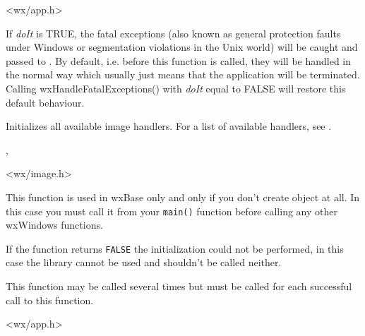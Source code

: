 
<wx/app.h>

\label{wxhandlefatalexceptions}


If {\it doIt} is TRUE, the fatal exceptions (also known as general protection
faults under Windows or segmentation violations in the Unix world) will be
caught and passed to .
By default, i.e. before this function is called, they will be handled in the
normal way which usually just means that the application will be terminated.
Calling wxHandleFatalExceptions() with {\it doIt} equal to FALSE will restore
this default behaviour.

\label{wxinitallimagehandlers}


Initializes all available image handlers. For a list of available handlers,
see .


, 


<wx/image.h>

\label{wxinitialize}


This function is used in wxBase only and only if you don't create
 object at all. In this case you must call it from your
{\tt main()} function before calling any other wxWindows functions.

If the function returns {\tt FALSE} the initialization could not be performed,
in this case the library cannot be used and
 shouldn't be called neither.

This function may be called several times but
 must be called for each successful
call to this function.


<wx/app.h>

\label{wxsafeyield}


